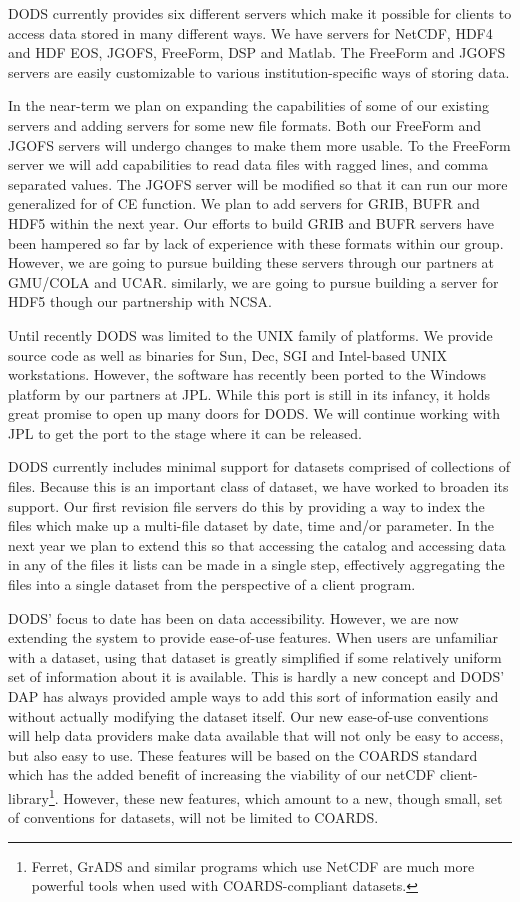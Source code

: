 \documentclass[10pt]{article}
\begin{document}
DODS currently provides six different servers which make it possible for
clients to access data stored in many different ways. We have servers for
NetCDF, HDF4 and HDF EOS, JGOFS, FreeForm, DSP and Matlab. The FreeForm and
JGOFS servers are easily customizable to various institution-specific ways of
storing data. 

In the near-term we plan on expanding the capabilities of some of our
existing servers and adding servers for some new file formats. Both our
FreeForm and JGOFS servers will undergo changes to make them more usable.  To
the FreeForm server we will add capabilities to read data files with ragged
lines, and comma separated values. The JGOFS server will be modified so that
it can run our more generalized for of CE function. We plan to add servers
for GRIB, BUFR and HDF5 within the next year. Our efforts to build GRIB and
BUFR servers have been hampered so far by lack of experience with these
formats within our group. However, we are going to pursue building these
servers through our partners at GMU/COLA and UCAR. similarly, we are going to
pursue building a server for HDF5 though our partnership with NCSA.

Until recently DODS was limited to the UNIX family of platforms. We provide
source code as well as binaries for Sun, Dec, SGI and Intel-based UNIX
workstations. However, the software has recently been ported to the Windows
platform by our partners at JPL. While this port is still in its infancy, it
holds great promise to open up many doors for DODS. We will continue working
with JPL to get the port to the stage where it can be released.

DODS currently includes minimal support for datasets comprised of collections
of files. Because this is an important class of dataset, we have worked to
broaden its support. Our first revision file servers do this by providing a
way to index the files which make up a multi-file dataset by date, time
and/or parameter. In the next year we plan to extend this so that accessing
the catalog and accessing data in any of the files it lists can be made in a
single step, effectively aggregating the files into a single dataset from the
perspective of a client program.

DODS' focus to date has been on data accessibility. However, we are now
extending the system to provide ease-of-use features. When users are
unfamiliar with a dataset, using that dataset is greatly simplified if some
relatively uniform set of information about it is available. This is hardly a
new concept and DODS' DAP has always provided ample ways to add this sort of
information easily and without actually modifying the dataset itself. Our new
ease-of-use conventions will help data providers make data available that
will not only be easy to access, but also easy to use. These features will be
based on the COARDS standard\cite{COARDS} which has the added benefit of
increasing the viability of our netCDF client-library\footnote{Ferret, GrADS
  and similar programs which use NetCDF are much more powerful tools when
  used with COARDS-compliant datasets.}.  However, these new features, which
amount to a new, though small, set of conventions for datasets, will not be
limited to COARDS.
\end{document}
